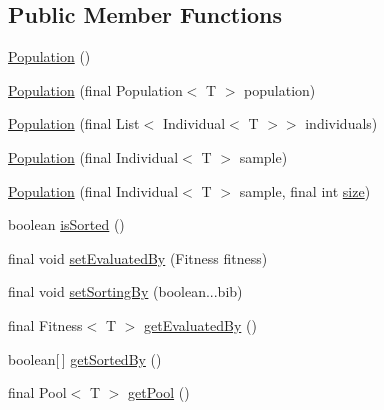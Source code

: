 \subsection*{Public Member Functions}
\begin{DoxyCompactItemize}
\item 
\hyperlink{classjenes_1_1population_1_1_population_3_01_t_01extends_01_chromosome_01_4_a0f7b4a9eda8a4dadbc70f8585def56bd}{Population} ()
\item 
\hyperlink{classjenes_1_1population_1_1_population_3_01_t_01extends_01_chromosome_01_4_a30e57f3d2c31bc1c7070557b0d6d4d33}{Population} (final Population$<$ T $>$ population)
\item 
\hyperlink{classjenes_1_1population_1_1_population_3_01_t_01extends_01_chromosome_01_4_a22f453b17c143bdeb4ca7597163e5899}{Population} (final List$<$ Individual$<$ T $>$$>$ individuals)
\item 
\hyperlink{classjenes_1_1population_1_1_population_3_01_t_01extends_01_chromosome_01_4_a0a0c6c3fdf74d042c638022694b47d53}{Population} (final Individual$<$ T $>$ sample)
\item 
\hyperlink{classjenes_1_1population_1_1_population_3_01_t_01extends_01_chromosome_01_4_ae4dc3ffb0550ac33bf726b4c9e531600}{Population} (final Individual$<$ T $>$ sample, final int \hyperlink{classjenes_1_1population_1_1_population_3_01_t_01extends_01_chromosome_01_4_adb9f8282e00932d31fddaa4218c5712e}{size})
\item 
boolean \hyperlink{classjenes_1_1population_1_1_population_3_01_t_01extends_01_chromosome_01_4_a1d0332ff448da8e153fa5f5b17966ccc}{is\-Sorted} ()
\item 
final void \hyperlink{classjenes_1_1population_1_1_population_3_01_t_01extends_01_chromosome_01_4_a569c046ba0bc1905fe60287dd26b5854}{set\-Evaluated\-By} (Fitness fitness)
\item 
final void \hyperlink{classjenes_1_1population_1_1_population_3_01_t_01extends_01_chromosome_01_4_ab0b674564e78c0f005db4aa32ade31ae}{set\-Sorting\-By} (boolean...\-bib)
\item 
final Fitness$<$ T $>$ \hyperlink{classjenes_1_1population_1_1_population_3_01_t_01extends_01_chromosome_01_4_ab50a1d2686fe3733e0fbd094fc91b35e}{get\-Evaluated\-By} ()
\item 
boolean\mbox{[}$\,$\mbox{]} \hyperlink{classjenes_1_1population_1_1_population_3_01_t_01extends_01_chromosome_01_4_a04da91b60ee40df76527c46f6bc47492}{get\-Sorted\-By} ()
\item 
final Pool$<$ T $>$ \hyperlink{classjenes_1_1population_1_1_population_3_01_t_01extends_01_chromosome_01_4_a366ef0124b1007ce7494c974279cb2a7}{get\-Pool} ()
$$
\end{DoxyCompactItemize}
